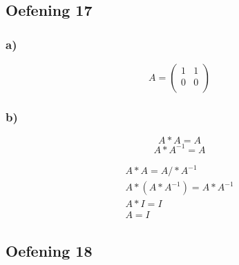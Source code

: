 \documentclass[lineaire_algebra_oplossingen.tex]{subfiles}
\begin{document}
\subsection{Oefening 17}
\subsubsection*{a)}
\[
A= \left(\begin{array} {cc}
    1 & 1\\
    0 & 0\\
\end{array} \right)
\]

\subsubsection*{b)}
\[
A*A=A 
\]
\[
A*A^{-1}=A
\]

\begin{gather*}
A*A=A /*A^{-1}\\
A*(A*A^{-1})=A*A^{-1}\\
A*I=I\\
A=I
\end{gather*}

\subsection{Oefening 18}
\end{document}
